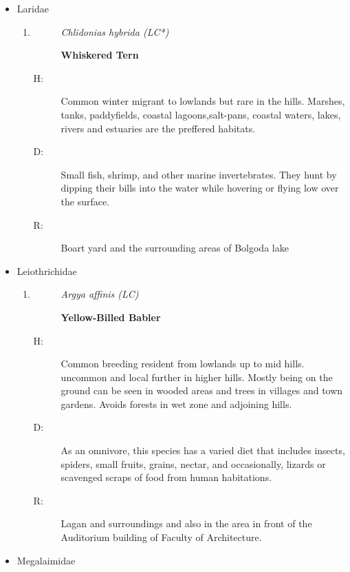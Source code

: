 \begin{itemize}
\item%
Laridae%
\begin{enumerate}%
\item%
\begin{description}%
\item[]%
\textit{Chlidonias hybrida (LC*)}%
\item[]%
\textbf{Whiskered Tern}%
\end{description}%
\begin{description}%
\item[H: ]%
Common winter migrant to lowlands but rare in the hills. Marshes, tanks, paddyfields, coastal lagoons,salt{-}pans, coastal waters, lakes, rivers and estuaries are the preffered habitats.%
\item[D: ]%
 Small fish, shrimp, and other marine invertebrates. They hunt by dipping their bills into the water while hovering or flying low over the surface.%
\item[R: ]%
Boart yard and the surrounding areas of Bolgoda lake%
\end{description}%
\end{enumerate}%
\item%
Leiothrichidae%
\begin{enumerate}%
\item%
\begin{description}%
\item[]%
\textit{Argya affinis (LC)}%
\item[]%
\textbf{Yellow{-}Billed Babler}%
\end{description}%
\begin{description}%
\item[H: ]%
Common breeding resident from lowlands up to mid hills. uncommon and local further in higher hills. Mostly being on the ground can be seen in wooded areas and trees in villages and town gardens. Avoids forests in wet zone and adjoining hills. %
\item[D: ]%
As an omnivore, this species has a varied diet that includes insects, spiders, small fruits, grains, nectar, and occasionally, lizards or scavenged scraps of food from human habitations.%
\item[R: ]%
Lagan and surroundings and also in the area in front of the Auditorium building of Faculty of Architecture.%
\end{description}%
\end{enumerate}%
\item%
Megalaimidae%
\begin{enumerate}%

\end{enumerate}
\end{itemize}
